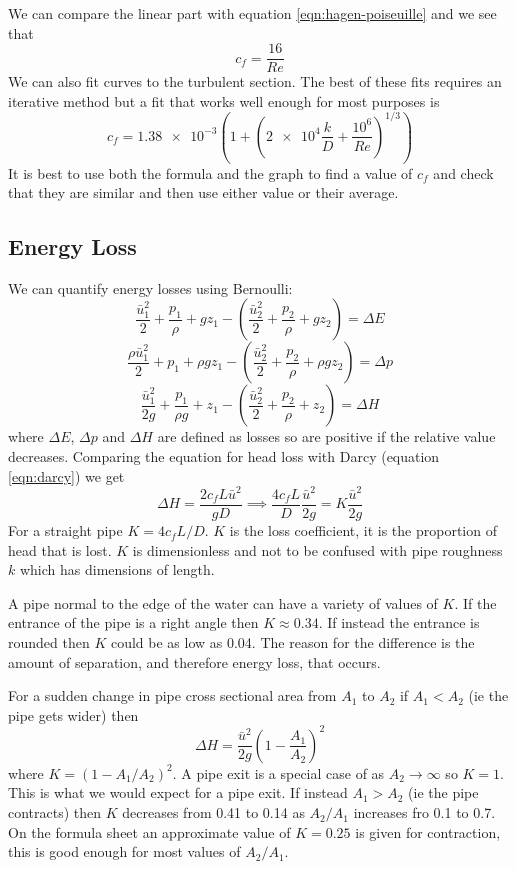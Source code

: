 \documentclass{article}
\begin{document}
    We can compare the linear part with equation \ref{eqn:hagen-poiseuille} and we see that
    \[c_f = \frac{16}{Re}\]
    We can also fit curves to the turbulent section.
    The best of these fits requires an iterative method but a fit that works well enough for most purposes is
    \[c_f = \num{1.38e-3}\left(1 + \left(\num{2e4}\frac{k}{D} + \frac{10^6}{Re}\right)^{1/3}\right)\]
    It is best to use both the formula and the graph to find a value of \(c_f\) and check that they are similar and then use either value or their average.
    
    \subsection{Energy Loss}
    We can quantify energy losses using Bernoulli:
    \[\frac{\bar u_1^2}{2} + \frac{p_1}{\rho} + gz_1 - \left(\frac{\bar u_2^2}{2} + \frac{p_2}{\rho} + gz_2\right) = \Delta E\]
    \[\frac{\rho\bar u_1^2}{2} + p_1 + \rho gz_1 - \left(\frac{\bar u_2^2}{2} + \frac{p_2}{\rho} + \rho gz_2\right) = \Delta p\]
    \[\frac{\bar u_1^2}{2g} + \frac{p_1}{\rho g} + z_1 - \left(\frac{\bar u_2^2}{2} + \frac{p_2}{\rho} + z_2\right) = \Delta H\]
    where \(\Delta E\), \(\Delta p\) and \(\Delta H\) are defined as losses so are positive if the relative value decreases.
    Comparing the equation for head loss with Darcy (equation \ref{eqn:darcy}) we get
    \[\Delta H = \frac{2c_fL\bar u^2}{gD}\implies \frac{4c_fL}{D}\frac{\bar u^2}{2g} = K\frac{\bar u^2}{2g}\]
    For a straight pipe \(K = 4c_fL/D\). 
    \(K\) is the loss coefficient, it is the proportion of head that is lost.
    \(K\) is dimensionless and not to be confused with pipe roughness \(k\) which has dimensions of length.
    
    A pipe normal to the edge of the water can have a variety of values of \(K\).
    If the entrance of the pipe is a right angle then \(K\approx 0.34\).
    If instead the entrance is rounded then \(K\) could be as low as 0.04.
    The reason for the difference is the amount of separation, and therefore energy loss, that occurs.
    
    For a sudden change in pipe cross sectional area from \(A_1\) to \(A_2\) if \(A_1 < A_2\) (ie the pipe gets wider) then
    \[\Delta H = \frac{\bar u^2}{2g}\left(1 - \frac{A_1}{A_2}\right)^2\]
    where \(K = (1 - A_1/A_2)^2\).
    A pipe exit is a special case of as \(A_2\to\infty\) so \(K = 1\).
    This is what we would expect for a pipe exit.
    If instead \(A_1 > A_2\) (ie the pipe contracts) then \(K\) decreases from 0.41 to 0.14 as \(A_2/A_1\) increases fro 0.1 to 0.7.
    On the formula sheet an approximate value of \(K = 0.25\) is given for contraction, this is good enough for most values of \(A_2/A_1\).
    
\end{document}
